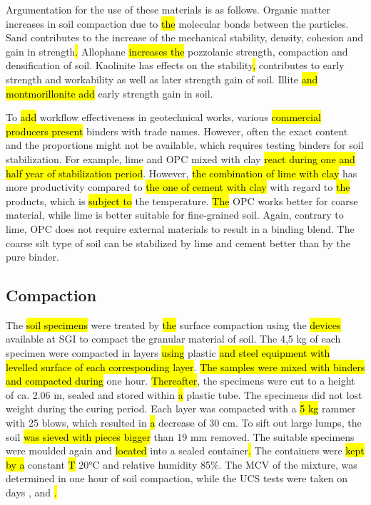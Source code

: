 \documentclass[electronics,article,submit,pdftex,moreauthors]{Definitions/mdpi}
\begin{document}
Argumentation for the use of these materials is as follows. Organic matter increases in soil compaction due to \hl{the} molecular bonds between the particles. Sand contributes to the increase of the mechanical stability, density, cohesion and gain in\hl{ }strength\hl{. }Allophane \hl{increases the} pozzolanic strength, compaction and densification of soil. Kaolinite has effects on the\hl{ }stability\hl{, }contributes to\hl{ }early strength and workability as well as later strength gain of soil. Illite \hl{and montmorillonite add} early strength gain\hl{ }in soil. 

To\hl{ add }workflow effectiveness in\hl{ }geotechnical works, various \hl{commercial producers present }binders with trade names. However, often the exact content and the proportions might not be available, which requires testing binders for soil stabilization. For example, lime and OPC mixed with clay \hl{react during one and half year of stabilization period}. However, \hl{the combination of lime with clay} has more productivity compared to \hl{the one of cement with clay} with regard to \hl{the} products, which is \hl{subject to} the temperature. \hl{The} OPC works better for coarse material, while lime is better suitable for fine-grained soil. Again, contrary to lime, OPC does not require external materials to result in a binding blend. The coarse silt type of soil can be stabilized by lime and cement better than by the pure binder.

\subsection{Compaction}
The \hl{soil specimens} were treated by \hl{the} surface compaction using the \hl{devices} available at SGI to compact the granular material of soil. The 4,5 kg of each\hl{ }specimen\hl{ }were compacted in\hl{ }layers \hl{using }plastic \hl{and steel equipment with levelled surface of each corresponding layer}. \hl{The samples were mixed with binders and compacted during} one hour. \hl{Thereafter}, the specimens were cut to a height of ca. 2.06 m, sealed \hl{ }and stored within \hl{a} plastic tube. The specimens did not lost weight during the curing period. Each layer was compacted with a \hl{5 kg} rammer with 25 blows, which resulted in \hl{a} decrease of 30 cm. To sift out large lumps, the soil \hl{was sieved with pieces bigger} than 19 mm\hl{ }removed. The suitable specimens were\hl{ }moulded again and \hl{located} into a sealed container\hl{. }The containers were \hl{kept by a} constant \hl{T }20°C and\hl{ }relative humidity\hl{ }85\%. The MCV of the mixture, was determined in one hour of soil compaction, while the UCS tests were taken on days ,  and \hl{.} 
\end{document}
